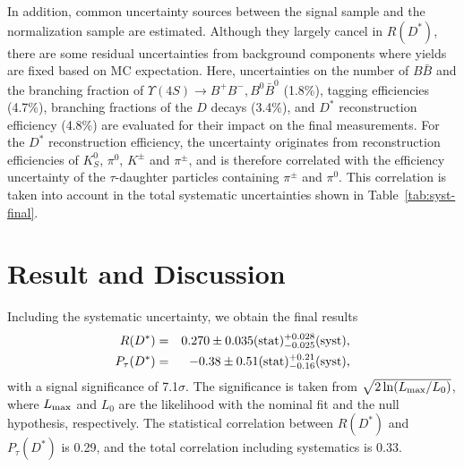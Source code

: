 \documentclass[aps,prd,twocolumn,superscriptaddress,showpacs,preprintnumbers,amsmath,amssymb]{revtex4-1}
\begin{document}
In addition, common uncertainty sources between the signal sample and the normalization sample are estimated. Although they largely cancel in $R(D^*)$, there are some residual uncertainties from background components where yields are fixed based on MC expectation. Here, uncertainties on the number of $B{\bar B}$ and the branching fraction of $\Upsilon(4S) \rightarrow B^+ B^-, B^0 \bar{B}^0$ (1.8\%), tagging efficiencies (4.7\%), branching fractions of the $D$ decays (3.4\%), and $D^*$ reconstruction efficiency (4.8\%) are evaluated for their impact on the final measurements. For the $D^*$ reconstruction efficiency, the uncertainty originates from reconstruction efficiencies of $K_S^0$, $\pi^0$, $K^{\pm}$ and $\pi^{\pm}$, and is therefore correlated with the efficiency uncertainty of the $\tau$-daughter particles containing $\pi^{\pm}$ and $\pi^0$. This correlation is taken into account in the total systematic uncertainties shown in Table~\ref{tab:syst-final}.

\section{Result and Discussion}

Including the systematic uncertainty, we obtain the final results
\begin{eqnarray}
  R(D^*)   &=& 0.270 \pm 0.035 ({\rm stat}) ^{+0.028} _{-0.025} ({\rm syst}),\\
  P_\tau(D^*) &=& -0.38 \pm 0.51 ({\rm stat}) ^{+0.21} _{-0.16} ({\rm syst}),
\end{eqnarray}
with a signal significance of 7.1$\sigma$. The significance is taken from $\sqrt{2 \ln (L_{\rm max} / {L_0})}$, where $L_{\rm max}$ and $L_0$ are the likelihood with the nominal fit and the null hypothesis, respectively. The statistical correlation between $R(D^*)$ and $P_\tau(D^*)$ is 0.29, and the total correlation including systematics is 0.33.
\end{document}
